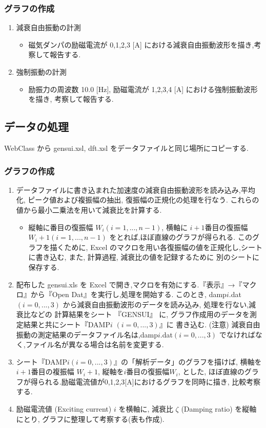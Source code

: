 \documentclass[a4paper,10.5pt]{jsarticle}
\begin{document}
\subsubsection{グラフの作成}
\begin{enumerate}
  \item 減衰自由振動の計測
  \begin{itemize}
    \item 磁気ダンパの励磁電流が 0,1,2,3 [A] における減衰自由振動波形を描き,考察して報告する.
  \end{itemize}
  \item 強制振動の計測
  \begin{itemize}
    \item 励振力の周波数 10.0 [Hz], 励磁電流が 1,2,3,4 [A] における強制振動波形を描き, 考察して報告する.
  \end{itemize}
\end{enumerate}

\subsection{データの処理}
WebClass から gensui.xsl, dft.xsl をデータファイルと同じ場所にコピーする.

\subsubsection{グラフの作成}
\begin{enumerate}
  \item データファイルに書き込まれた加速度の減衰自由振動波形を読み込み,平均化, ピーク値および複振幅の抽出,
  復振幅の正規化の処理を行なう. これらの値から最小二乗法を用いて減衰比を計算する.
  \begin{itemize}
    \item 縦軸に番目の復振幅 $W_i(i=1,...,n-1)$, 
    横軸に $i+1$番目の復振幅 $W_i+1 (i=1,...,n-1)$ をとれば,ほぼ直線のグラフが得られる. 
    このグラフを描くために, Excel のマクロを用い各復振幅の値を正規化し,シートに書き込む,
    また, 計算過程, 減衰比の値を記録するために 別のシートに保存する.
  \end{itemize}
  \item 配布した gensui.xls を Excel で開き,マクロを有効にする.『表示』→『マクロ』から『Open Dat』を実行し,処理を開始する.
  このとき, damp$i$.dat$(i=0,...,3)$ から減衰自由振動波形のデータを読み込み, 
  処理を行ない,減衰比などの 計算結果をシート 『GENSUI』 に, 
  グラフ作成用のデータを測定結果と共にシート『DAMP$i$ $(i=0,...,3)$』に 書き込む.
  (注意) 減衰自由振動の測定結果のデータファイル名は,damp$i$.dat$(i=0,...,3)$ でなければなく,ファイル名が異なる場合は名前を変更する.
  \item シート『DAMP$i (i=0,...,3)$』の「解析データ」のグラフを描けば, 横軸を$i+1$番目の複振幅 $W_i+1$,
  縦軸を$i$番目の復振幅$W_i$, とした, ほぼ直線のグラフが得られる.励磁電流値が0,1,2,3[A]におけるグラフを同時に描き, 比較考察する.
  \item 励磁電流値 (Exciting current) $i$ を横軸に,
  減衰比 $\zeta$ (Damping ratio) を縦軸にとり, グラフに整理して考察する(表も作成).
\end{enumerate}
\end{document}
